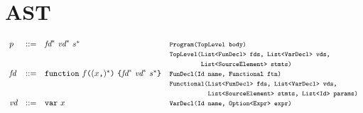 \chapter{AST}
\small
\[
\begin{array}{llll}
\pgm & ::=  & \fd^*\ \vd^*\ \stmt^* & \mtt{Program(TopLevel body)}\\
&&&\mtt{TopLevel(List<FunDecl> fds, List<VarDecl> vds,}\\
&&&\mtt{\phantom{TopLevel(}List<SourceElement> stmts)}\\

\fd &::=& {\tt function} \ f \verb+(+(x\verb+,+)^*\verb+)+ \ \verb+{+\fd^*\ \vd^*\ \stmt^*\verb+}+
  & \mtt{FunDecl(Id name, Functional ftn)}\\
&&&\mtt{Functional(List<FunDecl> fds, List<VarDecl> vds,}\\
&&&\mtt{\phantom{Functional(}List<SourceElement> stmts, List<Id> params)}\\

\vd &::=& {\tt var} \ x & \mtt{VarDecl(Id name, Option<Expr> expr)}\\


\end{array}\]
